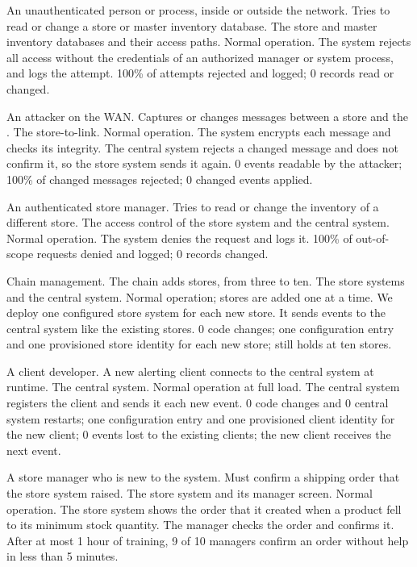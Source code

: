   {An unauthenticated person or process, inside or outside the network.}
  {Tries to read or change a store or master inventory database.}
  {The store and master inventory databases and their access paths.}
  {Normal operation.}
  {The system rejects all access without the credentials of an authorized manager or system process, and logs the attempt.}
  {100\% of attempts rejected and logged; 0 records read or changed.}

  {An attacker on the WAN.}
  {Captures or changes messages between a store and the \DC.}
  {The store-to-\DC link.}
  {Normal operation.}
  {The system encrypts each message and checks its integrity. The central system rejects a changed message and does not confirm it, so the store system sends it again.}
  {0 events readable by the attacker; 100\% of changed messages rejected; 0 changed events applied.}

  {An authenticated store manager.}
  {Tries to read or change the inventory of a different store.}
  {The access control of the store system and the central system.}
  {Normal operation.}
  {The system denies the request and logs it.}
  {100\% of out-of-scope requests denied and logged; 0 records changed.}

  {Chain management.}
  {The chain adds stores, from three to ten.}
  {The store systems and the central system.}
  {Normal operation; stores are added one at a time.}
  {We deploy one configured store system for each new store. It sends events to the central system like the existing stores.}
  {0 code changes; one configuration entry and one provisioned store identity for each new store;  still holds at ten stores.}

  {A client developer.}
  {A new alerting client connects to the central system at runtime.}
  {The central system.}
  {Normal operation at full load.}
  {The central system registers the client and sends it each new event.}
  {0 code changes and 0 central system restarts; one configuration entry and one provisioned client identity for the new client; 0 events lost to the existing clients; the new client receives the next event.}

  {A store manager who is new to the system.}
  {Must confirm a shipping order that the store system raised.}
  {The store system and its manager screen.}
  {Normal operation.}
  {The store system shows the order that it created when a product fell to its minimum stock quantity. The manager checks the order and confirms it.}
  {After at most 1 hour of training, 9 of 10 managers confirm an order without help in less than 5 minutes.}

